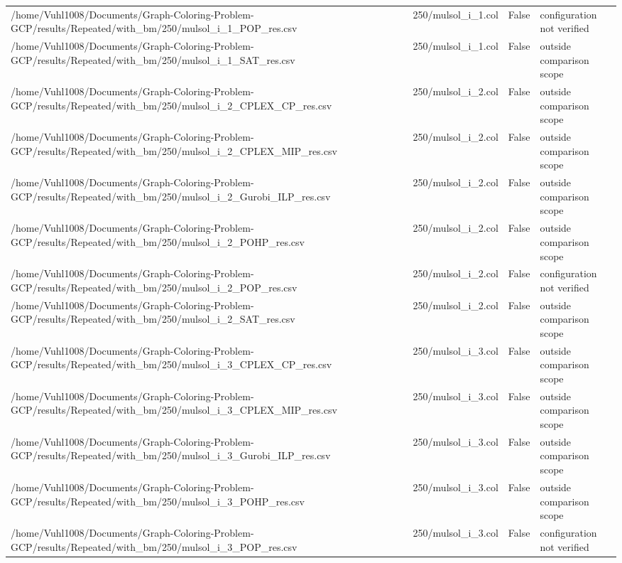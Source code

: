 \begin{table}[htbp]
\begin{tabular}{llll}
/home/Vuhl1008/Documents/Graph-Coloring-Problem-GCP/results/Repeated/with\_bm/250/mulsol\_i\_1\_POP\_res.csv & 250/mulsol\_i\_1.col & False & configuration not verified \\
/home/Vuhl1008/Documents/Graph-Coloring-Problem-GCP/results/Repeated/with\_bm/250/mulsol\_i\_1\_SAT\_res.csv & 250/mulsol\_i\_1.col & False & outside comparison scope \\
/home/Vuhl1008/Documents/Graph-Coloring-Problem-GCP/results/Repeated/with\_bm/250/mulsol\_i\_2\_CPLEX\_CP\_res.csv & 250/mulsol\_i\_2.col & False & outside comparison scope \\
/home/Vuhl1008/Documents/Graph-Coloring-Problem-GCP/results/Repeated/with\_bm/250/mulsol\_i\_2\_CPLEX\_MIP\_res.csv & 250/mulsol\_i\_2.col & False & outside comparison scope \\
/home/Vuhl1008/Documents/Graph-Coloring-Problem-GCP/results/Repeated/with\_bm/250/mulsol\_i\_2\_Gurobi\_ILP\_res.csv & 250/mulsol\_i\_2.col & False & outside comparison scope \\
/home/Vuhl1008/Documents/Graph-Coloring-Problem-GCP/results/Repeated/with\_bm/250/mulsol\_i\_2\_POHP\_res.csv & 250/mulsol\_i\_2.col & False & outside comparison scope \\
/home/Vuhl1008/Documents/Graph-Coloring-Problem-GCP/results/Repeated/with\_bm/250/mulsol\_i\_2\_POP\_res.csv & 250/mulsol\_i\_2.col & False & configuration not verified \\
/home/Vuhl1008/Documents/Graph-Coloring-Problem-GCP/results/Repeated/with\_bm/250/mulsol\_i\_2\_SAT\_res.csv & 250/mulsol\_i\_2.col & False & outside comparison scope \\
/home/Vuhl1008/Documents/Graph-Coloring-Problem-GCP/results/Repeated/with\_bm/250/mulsol\_i\_3\_CPLEX\_CP\_res.csv & 250/mulsol\_i\_3.col & False & outside comparison scope \\
/home/Vuhl1008/Documents/Graph-Coloring-Problem-GCP/results/Repeated/with\_bm/250/mulsol\_i\_3\_CPLEX\_MIP\_res.csv & 250/mulsol\_i\_3.col & False & outside comparison scope \\
/home/Vuhl1008/Documents/Graph-Coloring-Problem-GCP/results/Repeated/with\_bm/250/mulsol\_i\_3\_Gurobi\_ILP\_res.csv & 250/mulsol\_i\_3.col & False & outside comparison scope \\
/home/Vuhl1008/Documents/Graph-Coloring-Problem-GCP/results/Repeated/with\_bm/250/mulsol\_i\_3\_POHP\_res.csv & 250/mulsol\_i\_3.col & False & outside comparison scope \\
/home/Vuhl1008/Documents/Graph-Coloring-Problem-GCP/results/Repeated/with\_bm/250/mulsol\_i\_3\_POP\_res.csv & 250/mulsol\_i\_3.col & False & configuration not verified \\

\end{tabular}
\end{table}
